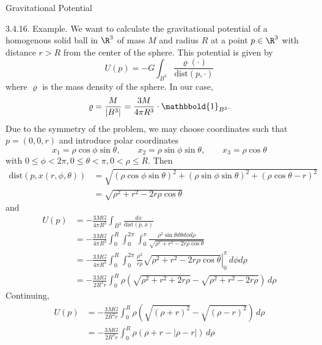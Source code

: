 \documentclass[smaller,hyperref={CJKbookmarks=true}]{beamer}
\begin{document}
\begin{frame}{Gravitational Potential}
\begin{spacing}{0.9}
\alert{3.4.16. Example.} We want to calculate the gravitational potential of a
homogenous solid ball in $\R^3$ of mass $M$ and radius $R$ at a point $p\in\R^3$ with distance $r>R$ from the center of the sphere. This potential is given by
\[U(p)=-G\int_{B^3}\frac{\varrho(\cdot)}{\text{dist}(p,\cdot)}\]
where $\varrho$ is the mass density of the sphere. In our case,
\[\varrho=\frac{M}{|B^3|}=\frac{3M}{4\pi R^3}\cdot\mathbbold{1}_{B^3}.\]
Due to the symmetry of the problem, we may choose coordinates such
that $p=(0,0,r)$ and introduce polar coordinates
\[x_1=\rho\cos\phi\sin\theta,\qquad
x_2=\rho\sin\phi\sin\theta,\qquad
x_3=\rho\cos\theta\]
with $0\leq\phi<2\pi,0\leq\theta<\pi,0<\rho\leq R$.
\newpage
Then
\begin{equation*}
  \begin{split}
     \text{dist}\left(p,x(r,\phi,\theta)\right) &=\sqrt{(\rho\cos\phi\sin\theta)^2+(\rho\sin\phi\sin\theta)^2+(\rho\cos\theta-r)^2} \\
       &=\sqrt{\rho^2+r^2-2r\rho\cos\theta}
  \end{split}
\end{equation*}
and
\begin{equation*}
  \begin{split}
     U(p) &=-\frac{3MG}{4\pi R^3}\int_{B^3}\frac{dx}{\text{dist}(p,x)} \\
       &=-\frac{3MG}{4\pi R^3}\int_{0}^{R}\int_{0}^{2\pi}
       \int_{0}^{\pi}\frac{\rho^2\sin\theta d\theta d\phi d\rho}{\sqrt{\rho^2+r^2-2r\rho\cos\theta}} \\
       &=-\frac{3MG}{4\pi R^3}\int_{0}^{R}\int_{0}^{2\pi}\left.\frac{\rho^2}{r\rho}
       \sqrt{\rho^2+r^2-2r\rho\cos\theta}\right|_0^\pi\,d\phi d\rho\\
       &=-\frac{3MG}{2R^3 r}\int_{0}^{R}\rho\left(\sqrt{\rho^2+r^2+2r\rho}-\sqrt{\rho^2+r^2-2r\rho}\right)\,d\rho
  \end{split}
\end{equation*}
\newpage
Continuing,
\begin{equation*}
  \begin{split}
     U(p) &=-\frac{3MG}{2R^3r}\int_{0}^{R}\rho\left(
     \sqrt{(\rho+r)^2}-\sqrt{(\rho-r)^2}\right)\,d\rho \\
       &=-\frac{3MG}{2R^3r}\int_{0}^{R}\rho(\rho+r-|\rho-r|)\,d\rho
  \end{split}
\end{equation*}

\end{spacing}
\end{frame}
\end{document}
